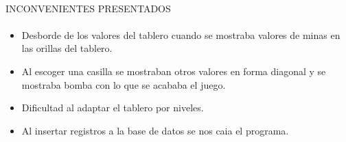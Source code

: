 \documentclass[../documentacion_buscaminas2013.tex]{subfiles}
\begin{document}
\paragraph{ }INCONVENIENTES PRESENTADOS

\paragraph{ }
\begin{itemize}
 \item Desborde de los valores del tablero cuando se mostraba valores de minas en las orillas del tablero.
 \item Al escoger una casilla se mostraban otros valores en forma diagonal y se mostraba bomba con lo que se acababa el juego.
 \item Dificultad al adaptar el tablero por niveles.
 \item Al insertar registros a la base de datos se nos caia el programa.


\end{itemize}



\clearpage
\end{document}
